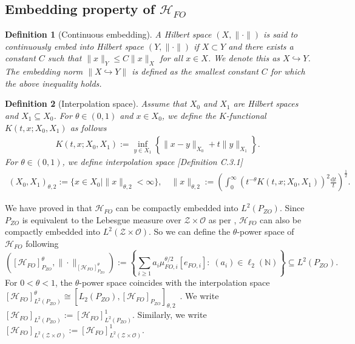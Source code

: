 \documentclass[11pt]{article}
\newcommand{\calZ}{\mathcal{Z}}
\newcommand{\calH}{\mathcal{H}}
\newcommand{\calO}{\mathcal{O}}
\newcommand{\0}{\mathbf{0}}
\newtheorem{defi}{Definition}
\begin{document}
\begin{appendix}
\subsection{Embedding property of $\calH_{FO}$}
\label{sec:emb}
\begin{defi}[Continuous embedding]
\label{defi:cont_embed}
    A Hilbert space $(X,\|\cdot\|)$ is said to continuously embed into Hilbert space $(Y,\|\cdot\|)$ if $X\subset Y$ and there exists a constant $C$ such that $\|x\|_{Y}\leq C\|x\|_{X} $ for all $x\in X$. 
    We denote this as $X\hookrightarrow Y$. The embedding norm $\|X\hookrightarrow Y\|$ is defined as the smallest constant $C$ for which the above inequality holds.
\end{defi}
\begin{defi}[Interpolation space]
\label{def:interpolation_space}
Assume that $X_0$ and $X_1$ are Hilbert spaces and $X_1\subseteq X_0$. For $\theta\in (0,1)$ and $x\in X_0$, we define the \emph{$K$-functional} $K(t,x;X_0,X_1)$ as follows
\begin{align}
\label{eq: k_functional_instance}
    K(t,x;X_0,X_1):= \inf_{y\in X_1}\left\{\|x-y\|_{X_0} + t\|y\|_{X_1}\right\} . 
\end{align}
For $\theta\in (0,1)$, we define \emph{interpolation space} \cite{Hytönen2016AnalysisBanachSpaces}[Definition C.3.1]
    \begin{align*}
        (X_0,X_1)_{\theta,2}:= \{x\in X_0 \mid \|x\|_{\theta,2}<\infty\},\quad 
        \|x\|_{\theta,2} := \left(\int_{0}^{\infty}\left(t^{-\theta}K(t,x;X_0,X_1)\right)^{2}\frac{\mathrm{d}t}{t}\right)^{\frac{1}{2}} .
    \end{align*}
\end{defi}
We have proved in  that $\calH_{FO}$ can be compactly embedded into $L^2(P_{ZO})$. 
Since $P_{ZO}$ is equivalent to the Lebesgue measure over $\calZ\times\calO$ as per , $\calH_{FO}$ can also be compactly embedded into $L^2(\calZ\times\calO)$. 
So we can define the $\theta$-power space of $\calH_{FO}$ following \cite[Eq. (36)]{steinwart2012mercer} 
\begin{equation*}
    \left([\calH_{FO}]^{\theta}_{P_{ZO}}, \|\cdot\|_{[\calH_{FO}]^{\theta}_{P_{ZO}}}\right) := \left\{\sum_{i\geq 1}a_i \mu_{FO,i}^{\theta/2}[e_{FO,i}]: \;(a_i)\in \ell_2(\mathbb{N})\right\}\subseteq L^2(P_{ZO}).
\end{equation*}
For $0<\theta<1$, the $\theta$-power space coincides with the interpolation space $[\calH_{FO}]^{\theta}_{L^2(P_{ZO})} \cong [L_2(P_{ZO}),[\calH_{FO}]_{P_{ZO}}]_{\theta, 2}$~\cite[Theorem 4.6]{steinwart2012mercer}.  We write $[\calH_{FO}]_{L^2(P_{ZO})} := [\calH_{FO}]_{L^2(P_{ZO})}^{1}$. Similarly, we write $[\calH_{FO}]_{L^2(\calZ\times \calO)} := [\calH_{FO}]_{L^2(\calZ\times \calO)}^{1}$. 


\end{appendix}
\end{document}
